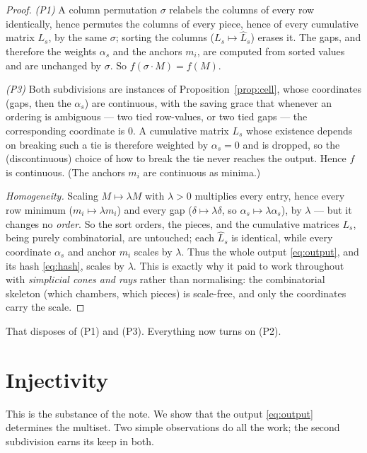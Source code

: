 \documentclass[11pt,a4paper]{article}
\theoremstyle{definition}
\theoremstyle{plain}
\newcommand{\bary}{\widehat}      %
\begin{document}
\begin{proof}
\emph{(P1)} A column permutation $\sigma$ relabels the columns of every row
identically, hence permutes the columns of every piece, hence of every
cumulative matrix $L_s$, by the same $\sigma$; sorting the columns
($L_s\mapsto\bary L_s$) erases it. The gaps, and therefore the weights
$\alpha_s$ and the anchors $m_i$, are computed from sorted values and are
unchanged by $\sigma$. So $f(\sigma\cdot M)=f(M)$.

\emph{(P3)} Both subdivisions are instances of
Proposition~\ref{prop:cell}, whose coordinates (gaps, then the $\alpha_s$) are
continuous, with the saving grace that whenever an ordering is ambiguous --- two
tied row-values, or two tied gaps --- the corresponding coordinate is $0$. A
cumulative matrix $L_s$ whose existence depends on breaking such a tie is
therefore weighted by $\alpha_s=0$ and is dropped, so the (discontinuous) choice
of how to break the tie never reaches the output. Hence $f$ is continuous. (The
anchors $m_i$ are continuous as minima.)

\emph{Homogeneity.} Scaling $M\mapsto\lambda M$ with $\lambda>0$ multiplies every
entry, hence every row minimum ($m_i\mapsto\lambda m_i$) and every gap
($\delta\mapsto\lambda\delta$, so $\alpha_s\mapsto\lambda\alpha_s$), by
$\lambda$ --- but it changes no \emph{order}. So the sort orders, the pieces, and
the cumulative matrices $L_s$, being purely combinatorial, are untouched; each
$\bary L_s$ is identical, while every coordinate $\alpha_s$ and anchor $m_i$
scales by $\lambda$. Thus the whole output \eqref{eq:output}, and its hash
\eqref{eq:hash}, scales by $\lambda$. This is exactly why it paid to work
throughout with \emph{simplicial cones and rays} rather than normalising: the
combinatorial skeleton (which chambers, which pieces) is scale-free, and only
the coordinates carry the scale.
\end{proof}

\noindent
That disposes of (P1) and (P3). Everything now turns on (P2).

\section{Injectivity}
\label{sec:inj}

This is the substance of the note. We show that the output \eqref{eq:output}
determines the multiset. Two simple observations do all the work; the second
subdivision earns its keep in both.
\end{document}
